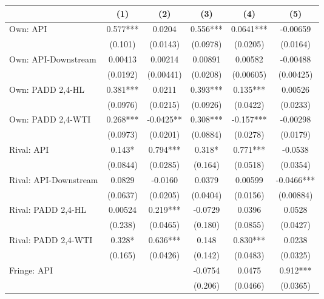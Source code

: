{
\def\sym#1{\ifmmode^{#1}\else\(^{#1}\)\fi}
\begin{tabular}{l*{5}{c}}
\toprule
                &\multicolumn{1}{c}{(1)}   &\multicolumn{1}{c}{(2)}   &\multicolumn{1}{c}{(3)}   &\multicolumn{1}{c}{(4)}   &\multicolumn{1}{c}{(5)}   \\
\midrule
Own: API        &    0.577***&   0.0204   &    0.556***&   0.0641***& -0.00659   \\
                &  (0.101)   & (0.0143)   & (0.0978)   & (0.0205)   & (0.0164)   \\
\addlinespace
Own: API-Downstream&  0.00413   &  0.00214   &  0.00891   &  0.00582   & -0.00488   \\
                & (0.0192)   &(0.00441)   & (0.0208)   &(0.00605)   &(0.00425)   \\
\addlinespace
Own: PADD 2,4-HL&    0.381***&   0.0211   &    0.393***&    0.135***&  0.00526   \\
                & (0.0976)   & (0.0215)   & (0.0926)   & (0.0422)   & (0.0233)   \\
\addlinespace
Own: PADD 2,4-WTI&    0.268***&  -0.0425** &    0.308***&   -0.157***& -0.00298   \\
                & (0.0973)   & (0.0201)   & (0.0884)   & (0.0278)   & (0.0179)   \\
\addlinespace
Rival: API      &    0.143*  &    0.794***&    0.318*  &    0.771***&  -0.0538   \\
                & (0.0844)   & (0.0285)   &  (0.164)   & (0.0518)   & (0.0354)   \\
\addlinespace
Rival: API-Downstream&   0.0829   &  -0.0160   &   0.0379   &  0.00599   &  -0.0466***\\
                & (0.0637)   & (0.0205)   & (0.0404)   & (0.0156)   &(0.00884)   \\
\addlinespace
Rival: PADD 2,4-HL&  0.00524   &    0.219***&  -0.0729   &   0.0396   &   0.0528   \\
                &  (0.238)   & (0.0465)   &  (0.180)   & (0.0855)   & (0.0427)   \\
\addlinespace
Rival: PADD 2,4-WTI&    0.328*  &    0.636***&    0.148   &    0.830***&   0.0238   \\
                &  (0.165)   & (0.0426)   &  (0.142)   & (0.0483)   & (0.0325)   \\
\addlinespace
Fringe: API     &            &            &  -0.0754   &   0.0475   &    0.912***\\
                &            &            &  (0.206)   & (0.0466)   & (0.0365)   \\

\end{tabular}}
